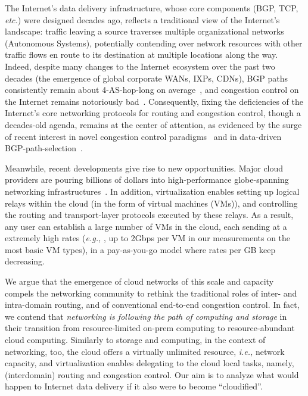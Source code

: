 \documentclass[newfonts=false,format=sigconf,anonymous,10pt,letterpaper]{acmart}
\providecommand{\ie}{\emph{i.e.,} }
\providecommand{\eg}{\emph{e.g.,} }
\begin{document}
The Internet's data delivery infrastructure, whose core components (BGP, TCP, \textit{etc.}) were designed decades ago, reflects a traditional view of the Internet's landscape: traffic leaving a source traverses multiple organizational networks (Autonomous Systems), potentially contending over network resources with other traffic flows en route to its destination at multiple locations along the way. Indeed, despite many changes to the Internet ecosystem over the past two decades (the emergence of global corporate WANs, IXPs, CDNs), BGP paths consistently remain about 4-AS-hop-long on average~\cite{kuhne2012ripe,apnic2017bgp}, and congestion control on the Internet remains notoriously bad~\cite{PCC}. Consequently, fixing the deficiencies of the Internet's core networking protocols for routing and congestion control, though a decades-old agenda, remains at the center of attention, as evidenced by the surge of recent interest in novel congestion control paradigms~\cite{PCC,BBR,keqiang2016acdc} and in data-driven BGP-path-selection~\cite{yap2017taking,schlinker2017engineering}.

Meanwhile, recent developments give rise to new opportunities. Major cloud providers are pouring billions of dollars into high-performance globe-spanning networking infrastructures~\cite{gcp2018spending,aws2018spending,microsoft2018spending}. In addition, virtualization enables setting up logical relays within the cloud (in the form of virtual machines (VMs)), and controlling the routing and transport-layer protocols executed by these relays. As a result, any user can establish a large number of VMs in the cloud, each sending at a extremely high rates (\eg, up to 2Gbps per VM in our measurements on the most basic VM types), in a pay-as-you-go model where rates per GB keep decreasing. 

We argue that the emergence of cloud networks of this scale and capacity compels the networking community to rethink the traditional roles of  inter- and intra-domain routing, and of conventional end-to-end congestion control. In fact, we contend that \textit{networking is following the path of computing and storage} in their transition from resource-limited on-prem computing to resource-abundant cloud computing.  Similarly to storage and computing, in the context of networking, too, the cloud offers a virtually unlimited resource, \ie network capacity, and virtualization enables delegating to the cloud local tasks, namely, (interdomain) routing and congestion control. Our aim is to analyze what would happen to Internet data delivery if it also were to become ``cloudified''.
\end{document}
